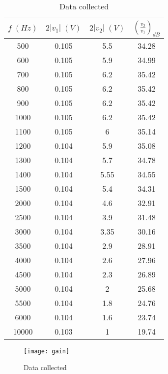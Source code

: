 \begin{table}[H]
\centering
\begin{tabular}{|c|c|c|c|}
        \hline
        $f\;(Hz)$ & $2|v_1|\;(V)$ & $2|v_2|\;(V)$ & $(\frac{v_2}{v_1})_{dB}$ \\
        \hline
        500 & 0.105 & 5.5 & 34.28 \\
        600 & 0.105 & 5.9 & 34.99 \\
        700 & 0.105 & 6.2 & 35.42 \\
        800 & 0.105 & 6.2 & 35.42 \\
        900 & 0.105 & 6.2 & 35.42 \\
        1000 & 0.105 & 6.2 & 35.42 \\
        1100 & 0.105 & 6 & 35.14 \\
        1200 & 0.104 & 5.9 & 35.08 \\
        1300 & 0.104 & 5.7 & 34.78 \\
        1400 & 0.104 & 5.55 & 34.55 \\
        1500 & 0.104 & 5.4 & 34.31 \\
        2000 & 0.104 & 4.6 & 32.91 \\
        2500 & 0.104 & 3.9 & 31.48 \\
        3000 & 0.104 & 3.35 & 30.16 \\
        3500 & 0.104 & 2.9 & 28.91 \\
        4000 & 0.104 & 2.6 & 27.96 \\
        4500 & 0.104 & 2.3 & 26.89 \\
        5000 & 0.104 & 2 & 25.68 \\
        5500 & 0.104 & 1.8 & 24.76 \\
        6000 & 0.104 & 1.6 & 23.74 \\
        10000 & 0.103 & 1 & 19.74 \\
        \hline
\end{tabular}
\caption{Data collected}
\label{data}
\end{table}

\begin{figure}[H]
\centering
\texttt{[image: gain]}
\caption{Data collected}
\label{data_graph}
\end{figure}
